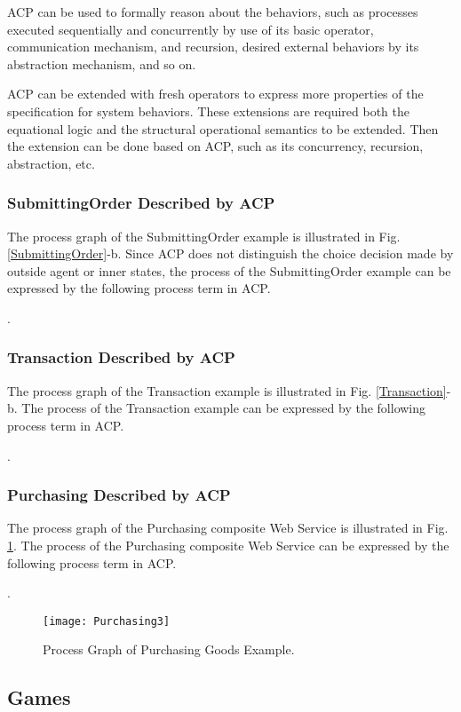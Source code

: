 \documentclass{fac}
\begin{document}
ACP can be used to formally reason about the behaviors, such as processes executed sequentially and concurrently by use of its basic operator, communication mechanism, and recursion, desired external behaviors by its abstraction mechanism, and so on.

ACP can be extended with fresh operators to express more properties of the specification for system behaviors. These extensions are required both the equational logic and the structural operational semantics to be extended. Then the extension can be done based on ACP, such as its concurrency, recursion, abstraction, etc.

\subsubsection{SubmittingOrder Described by ACP}

The process graph of the SubmittingOrder example is illustrated in Fig. \ref{SubmittingOrder}-b. Since ACP does not distinguish the choice decision made by outside agent or inner states, the process of the SubmittingOrder example can be expressed by the following process term in ACP.

.

\subsubsection{Transaction Described by ACP}

The process graph of the Transaction example is illustrated in Fig. \ref{Transaction}-b. The process of the Transaction example can be expressed by the following process term in ACP.

.

\subsubsection{Purchasing Described by ACP}

The process graph of the Purchasing composite Web Service is illustrated in Fig. \ref{Purchasing3}. The process of the Purchasing composite Web Service can be expressed by the following process term in ACP.

.

\begin{figure}
  \centering
\texttt{[image: Purchasing3]}
  \caption{Process Graph of Purchasing Goods Example.}
  \label{Purchasing3}
\end{figure}

\subsection{Games}\label{Games}
\end{document}
